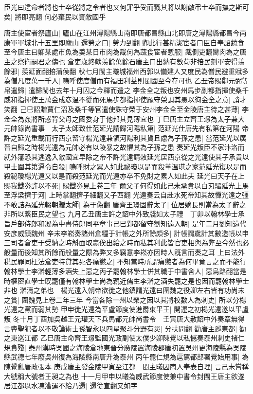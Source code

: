 臣光曰違命者將也士卒從將之令者也又何罪乎受而戮其將以謝敵弔士卒而撫之斯可矣|{
	將即亮翻}
何必棄民以資敵國乎

唐主使宦者祭廬山|{
	廬山在江州潯陽縣山南即唐都昌縣山北即唐之潯陽縣都昌今南康軍軍城北十五里即廬山}
還勞之曰|{
	勞力到翻}
卿此行甚精潔宦者曰臣自奉詔蔬食至今唐主曰卿某處市魚為羮某日市肉為胾何為蔬食宦者慙服|{
	胾側吏翻臠肉為之唐主之察衛嗣君之儔也}
倉吏歲終獻羨餘萬餘石唐主曰出納有數苟非掊民刻軍安得羨餘邪|{
	羨延面翻掊蒲侯翻}
秋七月閩主曦城福州西郭以備建人又度民為僧民避重賦多為僧凡度萬一千人|{
	嗚呼使度僧而有福田利益則閩國至今存可也}
乙丑帝賜鄭元弼等帛遣歸|{
	遣歸閩也去年十月囚之今釋而遣之}
李金全之叛也安州馬步副都指揮使桑千威和指揮使王萬金成彦温不從而死馬步都指揮使龎守榮誚其愚以徇金全之意|{
	誚才笑翻}
己巳詔贈賈仁沼及桑千等官遣使誅守榮于安州李金全至金陵唐主待之甚薄|{
	李金全為姦將所惑背父母之國委身于他邦其見薄宜也}
丁巳唐主立齊王璟為太子兼大元帥錄尚書事　太子太師致仕范延光請歸河陽私第|{
	范延光仕唐先有私第在河陽}
帝許之延光重載而行西京留守楊光遠兼領河陽利其貨且慮為子孫之患|{
	當范延光以廣晉自歸之時楊光遠為元帥必有以陵暴之故懼其為子孫之患}
奏延光叛臣不家汴洛而就外藩恐其逃逸入敵國宜早除之帝不許光遠請敇延光居西京從之光遠使其子承貴以甲士圍其第逼令自殺|{
	嗚呼財之累人如此祕瓊以是而殺董温琪之家范延光復以是而殺祕瓊楊光遠又以是而殺范延光而光遠亦卒不免財之累人如此夫}
延光曰天子在上賜我鐵劵許以不死|{
	賜鐵劵見上卷三年}
爾父子何得如此己未承貴以白刃驅延光上馬至浮梁擠于河|{
	上時掌翻擠子細翻又子西翻}
光遠奏云自赴水死帝知其故憚光遠之彊不敢詰為延光輟朝贈太師|{
	為于偽翻}
唐齊王璟固辭太子|{
	位居嫡長則當為太子辭之非所以繋臣民之望也}
九月乙丑唐主許之詔中外致牋如太子禮　丁卯以翰林學士承旨戶部侍郎和凝為中書侍郎同平章事己巳鄴都留守劉知遠入朝|{
	是年二月劉知遠代安彦威鎮魏州}
辛未李崧奏諸州倉糧于計帳之外所餘頗多|{
	計帳謂歲計其數造帳以申三司者倉吏于受納之時斛面取贏俟出給之時而私其利此皆官吏相與為弊至今然也必般量而後知其所餘而般量之際為弊又多竊意李崧亦因時人旣言而奏之耳}
上曰法外税民罪同枉法倉吏特貸其死各痛懲之|{
	不知當時所謂痛懲者為何畢竟言之而不能行}
翰林學士李澣輕薄多酒失上惡之丙子罷翰林學士併其職于中書舍人|{
	惡烏路翻當是時樞密直學士旣罷僅有翰林學士尚為親近儒生李澣之酒失罷之是也因而罷翰林學士非也}
澣濤之弟也　楊光遠入朝帝欲徙之他鎮謂光遠曰圍魏之役卿左右皆有功尚未之賞|{
	圍魏見上卷二年三年}
今當各除一州以榮之因以其將校數人為刺史|{
	所以分楊光遠之黨而弱其勢}
甲申徙光遠為平盧節度使進爵東平王|{
	開運之初楊光遠遂以平盧叛}
冬十月丁酉加吳越王元瓘天下兵馬都元帥尚書令　壬寅唐大赦詔中外奏章無得言睿聖犯者以不敬論術士孫智永以四星聚斗分野有災|{
	分扶問翻}
勸唐主廵東都|{
	勸之東巡江都}
乙巳唐主命齊王璟監國光政副使太僕少卿陳覺以私憾奏泰州刺史禇仁規貪殘|{
	泰州漢時吳國之海陵倉地東晉分廣陵置海陵郡唐初置吳州更海陵縣為吳陵縣武德七年廢吳州復為海陵縣南唐升為泰州}
丙午罷仁規為扈駕都部署覺始用事|{
	為陳覺亂唐政張本}
庚戌唐主發金陵甲寅至江都　閩主曦因商人奉表自理|{
	言己未嘗稱大號稱大號者王昶之為也}
十一月甲申以曦為威武節度使兼中書令封閩王唐主欲遂居江都以水凍漕運不給乃還|{
	還從宣翻又如字}


